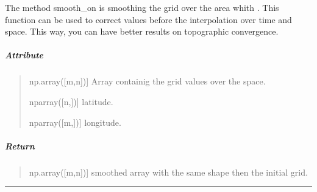 \documentclass[letterpaper,10pt,english]{sphinxmanual}
\begin{document}
\begin{fulllineitems}
\label{\detokenize{GRID_doc/GRID_class_doc:SL_C0de.grid.GRID.smooth_on}}
\pysigstartsignatures
{}
\pysigstopsignatures
\sphinxAtStartPar
The method \label{\detokenize{GRID_doc/GRID_class_doc:smooth-on}}smooth\_on is smoothing the grid over the area whith . This function can be used to correct values before the interpolation over time and space. This way, you can have better results on topographic convergence.


\subparagraph{Attribute}
\label{\detokenize{GRID_doc/GRID_class_doc:id3}}\begin{quote}
\begin{description}
\sphinxlineitem{grd}{[}np.array({[}m,n{]}){]}
\sphinxAtStartPar
Array containig the grid values over the space.

\sphinxlineitem{lat}{[}nparray({[}n,{]}){]}
\sphinxAtStartPar
latitude.

\sphinxlineitem{lon}{[}nparray({[}m,{]}){]}
\sphinxAtStartPar
longitude.

\end{description}
\end{quote}


\subparagraph{Return}
\label{\detokenize{GRID_doc/GRID_class_doc:id4}}\begin{quote}
\begin{description}
\sphinxlineitem{grd}{[}np.array({[}m,n{]}){]}
\sphinxAtStartPar
smoothed array with the same shape then the initial grid.

\end{description}
\end{quote}

\end{fulllineitems}



\bigskip\hrule\bigskip

\end{document}
